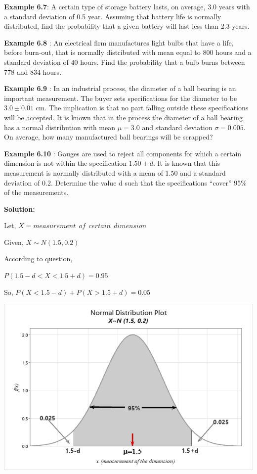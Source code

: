 \documentclass[
]{article}
\begin{document}
\textbf{Example 6.7}: A certain type of storage battery lasts, on average, 3.0 years with a standard deviation of 0.5 year. Assuming that battery life is normally distributed, find the probability that a given battery will last less than 2.3 years.

\textbf{Example 6.8} : An electrical firm manufactures light bulbs that have a life, before burn-out, that is normally distributed with mean equal to 800 hours and a standard deviation of 40 hours. Find the probability that a bulb burns between 778 and 834 hours.

\textbf{Example 6.9} : In an industrial process, the diameter of a ball bearing is an important measurement. The buyer sets specifications for the diameter to be \(3.0 \pm 0.01\) cm. The implication is that no part falling outside these specifications will be accepted. It is known that in the process the diameter of a ball bearing has a normal distribution with mean \(\mu = 3.0\) and standard deviation \(\sigma = 0.005\). On average, how many manufactured ball bearings will be scrapped?

\textbf{Example 6.10} : Gauges are used to reject all components for which a certain dimension is not within the specification \(1.50 \pm d\). It is known that this measurement is normally distributed with a mean of 1.50 and a standard deviation of 0.2. Determine the value d such that the specifications ``cover'' 95\% of the measurements.

\textbf{Solution:}

Let, \(X=measurement \ \ of \ \ certain \ \ dimension\)

Given, \(X\sim N(1.5,0.2)\)

According to question,

\(P(1.5-d<X<1.5+d)=0.95\)

So, \(P(X<1.5-d)+P(X>1.5+d)=0.05\)

\includegraphics{Walpole Example 6.10.png}
\end{document}
